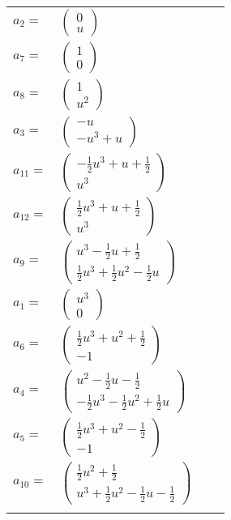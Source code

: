 \documentclass[1p]{elsarticle_modified}
\theoremstyle{definition}
\begin{document}
\begin{tabular}{m{7pt} m{180pt} m{7pt} m{180pt} }
\flushright $a_{2}=$&$\begin{pmatrix}0\\u\end{pmatrix}$ \\
\flushright $a_{7}=$&$\begin{pmatrix}1\\0\end{pmatrix}$ \\
\flushright $a_{8}=$&$\begin{pmatrix}1\\u^2\end{pmatrix}$ \\
\flushright $a_{3}=$&$\begin{pmatrix}- u\\- u^3+u\end{pmatrix}$ \\
\flushright $a_{11}=$&$\begin{pmatrix}-\frac{1}{2} u^3+u+\frac{1}{2}\\u^3\end{pmatrix}$ \\
\flushright $a_{12}=$&$\begin{pmatrix}\frac{1}{2} u^3+u+\frac{1}{2}\\u^3\end{pmatrix}$ \\
\flushright $a_{9}=$&$\begin{pmatrix}u^3-\frac{1}{2} u+\frac{1}{2}\\\frac{1}{2} u^3+\frac{1}{2} u^2-\frac{1}{2} u\end{pmatrix}$ \\
\flushright $a_{1}=$&$\begin{pmatrix}u^3\\0\end{pmatrix}$ \\
\flushright $a_{6}=$&$\begin{pmatrix}\frac{1}{2} u^3+u^2+\frac{1}{2}\\-1\end{pmatrix}$ \\
\flushright $a_{4}=$&$\begin{pmatrix}u^2-\frac{1}{2} u-\frac{1}{2}\\-\frac{1}{2} u^3-\frac{1}{2} u^2+\frac{1}{2} u\end{pmatrix}$ \\
\flushright $a_{5}=$&$\begin{pmatrix}\frac{1}{2} u^3+u^2-\frac{1}{2}\\-1\end{pmatrix}$ \\
\flushright $a_{10}=$&$\begin{pmatrix}\frac{1}{2} u^2+\frac{1}{2}\\u^3+\frac{1}{2} u^2-\frac{1}{2} u-\frac{1}{2}\end{pmatrix}$\\&\end{tabular}
\end{document}
